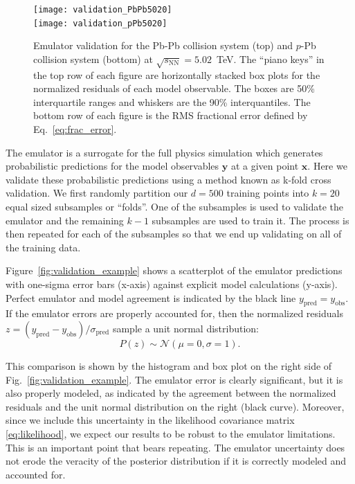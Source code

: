 \documentclass[aps,prc,reprint,amsmath,nofootinbib]{revtex4-1}
\newcommand{\sqrts}{\sqrt{s_\mathrm{NN}}}
\newcommand{\xv}{\mathbf x}
\newcommand{\yv}{\mathbf y}
\begin{document}
\begin{figure}
  \texttt{[image: validation\_PbPb5020]}\\
  \texttt{[image: validation\_pPb5020]}
  \caption{
    \label{fig:validation_all}
    Emulator validation for the Pb-Pb collision system (top) and $p$-Pb collision system (bottom) at $\sqrts=5.02$~TeV.
    The ``piano keys'' in the top row of each figure are horizontally stacked box plots for the normalized residuals of each model observable.
    The boxes are 50\% interquartile ranges and whiskers are the 90\% interquantiles.
    The bottom row of each figure is the RMS fractional error defined by Eq.~\eqref{eq:frac_error}.
  }
\end{figure}

The emulator is a surrogate for the full physics simulation which generates probabilistic predictions for the model observables $\yv$ at a given point $\xv$.
Here we validate these probabilistic predictions using a method known as k-fold cross validation.
We first randomly partition our $d=500$ training points into $k=20$ equal sized subsamples or ``folds''.
One of the subsamples is used to validate the emulator and the remaining $k-1$ subsamples are used to train it.
The process is then repeated for each of the subsamples so that we end up validating on all of the training data.

Figure~\ref{fig:validation_example} shows a scatterplot of the emulator predictions with one-sigma error bars (x-axis) against explicit model calculations (y-axis).
Perfect emulator and model agreement is indicated by the black line $y_\text{pred} = y_\text{obs}$.
If the emulator errors are properly accounted for, then the normalized residuals ${z=(y_\text{pred} - y_\text{obs})/\sigma_\text{pred}}$ sample a unit normal distribution:
\begin{equation}
  \label{eq:frac_error}
  P(z) \sim \mathcal{N}(\mu=0,\sigma=1).
\end{equation}

This comparison is shown by the histogram and box plot on the right side of Fig.~\ref{fig:validation_example}.
The emulator error is clearly significant, but it is also properly modeled, as indicated by the agreement between the normalized residuals and the unit normal distribution on the right (black curve).
Moreover, since we include this uncertainty in the likelihood covariance matrix \eqref{eq:likelihood}, we expect our results to be robust to the emulator limitations.
This is an important point that bears repeating.
The emulator uncertainty does not erode the veracity of the posterior distribution if it is correctly modeled and accounted for.
\end{document}
